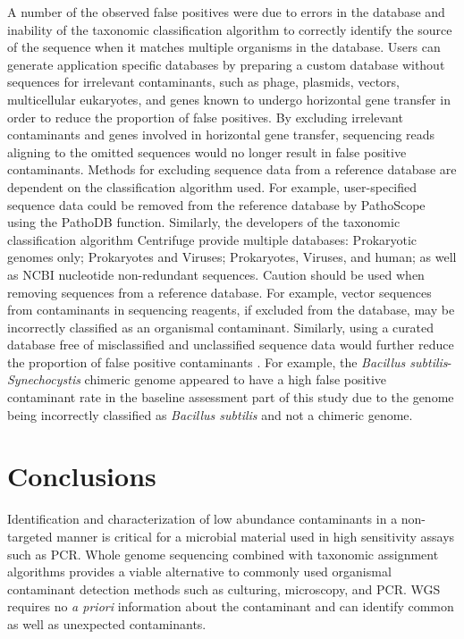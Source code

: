\documentclass[fleqn,10pt,lineno]{wlpeerj}\usepackage[]{graphicx}\usepackage[]{color}
\begin{document}
A number of the observed false positives were due to errors in the database and inability of the taxonomic classification algorithm to correctly identify the source of the sequence when it matches multiple organisms in the database. 
Users can generate application specific databases by preparing a custom database without sequences for irrelevant contaminants, such as phage, plasmids, vectors, multicellular eukaryotes, and genes known to undergo horizontal gene transfer in order to reduce the proportion of false positives. 
By excluding irrelevant contaminants and genes involved in horizontal gene transfer, sequencing reads aligning to the omitted sequences would no longer result in false positive contaminants.
Methods for excluding sequence data from a reference database are dependent on the classification algorithm used.
For example, user-specified sequence data could be removed from the reference database by PathoScope using the PathoDB function.
Similarly, the developers of the taxonomic classification algorithm Centrifuge provide multiple databases: Prokaryotic genomes only; Prokaryotes and Viruses; Prokaryotes, Viruses, and human; as well as NCBI nucleotide non-redundant sequences. 
Caution should be used when removing sequences from a reference database.
For example, vector sequences from contaminants in sequencing reagents, if excluded from the database, may be incorrectly classified as an organismal contaminant.
Similarly, using a curated database free of misclassified and unclassified sequence data would further reduce the proportion of false positive contaminants \citep{tennessen2015prodege}.
For example, the \textit{Bacillus subtilis}-\textit{Synechocystis} chimeric genome appeared to have a high false positive contaminant rate in the baseline assessment part of this study due to the genome being incorrectly classified as \textit{Bacillus subtilis} and not a chimeric genome.



\section*{Conclusions}
Identification and characterization of low abundance contaminants in a non-targeted manner is critical for a microbial material used in high sensitivity assays such as PCR.
Whole genome sequencing combined with taxonomic assignment algorithms provides a viable alternative to commonly used organismal contaminant detection methods such as culturing, microscopy, and PCR. 
WGS requires no \textit{a priori} information about the contaminant and can identify common as well as unexpected contaminants.
\end{document}

